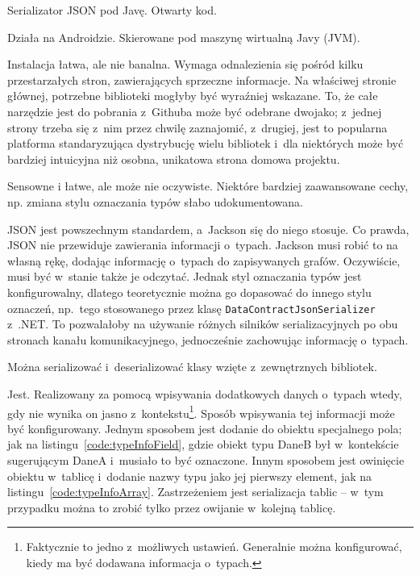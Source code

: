 \begin{description}
Serializator JSON pod Javę. Otwarty kod.

Działa na Androidzie. Skierowane pod maszynę wirtualną Javy (JVM).

Instalacja łatwa, ale nie banalna.
Wymaga odnalezienia się pośród kilku przestarzałych stron, zawierających sprzeczne informacje.
Na właściwej stronie głównej, potrzebne biblioteki mogłyby być wyraźniej wskazane.
To, że całe narzędzie jest do pobrania z~Githuba może być odebrane dwojako; z~jednej strony trzeba się z~nim przez chwilę zaznajomić, z~drugiej, jest to popularna platforma standaryzująca dystrybucję wielu bibliotek i~dla niektórych może być bardziej intuicyjna niż osobna, unikatowa strona domowa projektu.

Sensowne i łatwe, ale może nie oczywiste. Niektóre bardziej zaawansowane cechy, np. zmiana stylu oznaczania typów słabo udokumentowana.

JSON jest powszechnym standardem, a~Jackson się do niego stosuje.
Co prawda, JSON nie przewiduje zawierania informacji o~typach.
Jackson musi robić to na własną rękę, dodając informację o~typach do zapisywanych grafów. Oczywiście, musi być w~stanie także je odczytać.
Jednak styl oznaczania typów jest konfigurowalny, dlatego teoretycznie można go dopasować do innego stylu oznaczeń, np.\ tego stosowanego przez klasę \texttt{DataContractJsonSerializer} z~.NET\@.
To pozwalałoby na używanie różnych silników serializacyjnych po obu stronach kanału komunikacyjnego, jednocześnie zachowując informację o~typach.

Można serializować i~deserializować klasy wzięte z~zewnętrznych bibliotek.

Jest. Realizowany za pomocą wpisywania dodatkowych danych o~typach wtedy, gdy nie wynika on jasno z~kontekstu\footnote{Faktycznie to jedno z~możliwych ustawień. Generalnie można konfigurować, kiedy ma być dodawana informacja o~typach.}.
Sposób wpisywania tej informacji może być konfigurowany.
Jednym sposobem jest dodanie do obiektu specjalnego pola; jak na listingu~\ref{code:typeInfoField}, gdzie obiekt typu DaneB był w~kontekście sugerującym DaneA i~musiało to być oznaczone.
Innym sposobem jest owinięcie obiektu w~tablicę i~dodanie nazwy typu jako jej pierwszy element, jak na listingu~\ref{code:typeInfoArray}.
Zastrzeżeniem jest serializacja tablic -- w~tym przypadku można to zrobić tylko przez owijanie w~kolejną tablicę.


\end{description}
